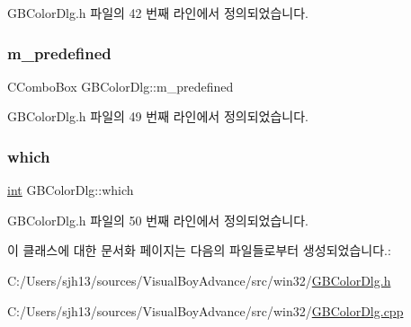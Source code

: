 G\+B\+Color\+Dlg.\+h 파일의 42 번째 라인에서 정의되었습니다.

\mbox{\label{class_g_b_color_dlg_abd7ea64ca037d12cec0615ef7872c66b}} 
\subsubsection{\texorpdfstring{m\+\_\+predefined}{m\_predefined}}
{\footnotesize\ttfamily C\+Combo\+Box G\+B\+Color\+Dlg\+::m\+\_\+predefined}



G\+B\+Color\+Dlg.\+h 파일의 49 번째 라인에서 정의되었습니다.

\mbox{\label{class_g_b_color_dlg_a8f7bbf1c4a4ffe4a6c57454b9087ff28}} 
\subsubsection{\texorpdfstring{which}{which}}
{\footnotesize\ttfamily \mbox{\hyperlink{_util_8cpp_a0ef32aa8672df19503a49fab2d0c8071}{int}} G\+B\+Color\+Dlg\+::which}



G\+B\+Color\+Dlg.\+h 파일의 50 번째 라인에서 정의되었습니다.



이 클래스에 대한 문서화 페이지는 다음의 파일들로부터 생성되었습니다.\+:\begin{DoxyCompactItemize}
\item 
C\+:/\+Users/sjh13/sources/\+Visual\+Boy\+Advance/src/win32/\mbox{\hyperlink{_g_b_color_dlg_8h}{G\+B\+Color\+Dlg.\+h}}\item 
C\+:/\+Users/sjh13/sources/\+Visual\+Boy\+Advance/src/win32/\mbox{\hyperlink{_g_b_color_dlg_8cpp}{G\+B\+Color\+Dlg.\+cpp}}\end{DoxyCompactItemize}
